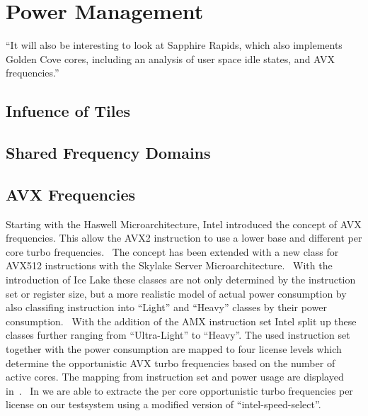\chapter{Power Management}
``It will also be interesting to look at Sapphire Rapids, which also implements Golden Cove cores, including an analysis of user space idle states, and AVX frequencies.''

\section{Infuence of Tiles}

\section{Shared Frequency Domains}

\section{AVX Frequencies}

Starting with the Haswell Microarchitecture, Intel introduced the concept of AVX frequencies.
This allow the AVX2 instruction to use a lower base and different per core turbo frequencies.~\cite{Hackenberg_2015_Haswell}
The concept has been extended with a new class for AVX512 instructions with the Skylake Server Microarchitecture.~\cite[Sec. 2.6.3]{Intel_Optimization_Reference_Manual_050}
With the introduction of Ice Lake these classes are not only determined by the instruction set or register size, but a more realistic model of actual power consumption by also classifing instruction into ``Light'' and ``Heavy'' classes by their power consumption.~\cite{papazian_new_2020}
With the addition of the AMX instruction set Intel split up these classes further ranging from ``Ultra-Light'' to ``Heavy''.
The used instruction set together with the power consumption are mapped to four license levels which determine the opportunistic AVX turbo frequencies based on the number of active cores.
The mapping from instruction set and power usage are displayed in~.~\cite{ServeTheHome_Emerald_Rapids_2023}
In  we are able to extracte the per core opportunistic turbo frequencies per license on our testsystem using a modified version of ``intel-speed-select''.


